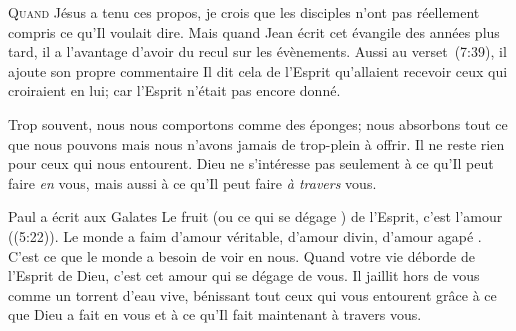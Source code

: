 





\lettrine{Q}{uand} Jésus a tenu ces propos,
 je crois que les disciples n'ont pas réellement compris
 ce qu'Il voulait dire. Mais quand Jean écrit cet évangile 
 des années plus tard, il a l'avantage d'avoir du recul sur les évènements.
 Aussi au verset~(7:39), il ajoute son propre commentaire\frcolon{}
 \Og Il dit cela de l'Esprit qu'allaient recevoir ceux qui croiraient en lui;
 car l'Esprit n'était pas encore donné. \Fg{}


Trop souvent, nous nous comportons comme des éponges;
 nous absorbons tout ce que nous pouvons mais nous n'avons jamais
 de trop-plein à offrir. Il ne reste rien pour ceux qui nous entourent.
 Dieu ne s'intéresse pas seulement à ce qu'Il peut faire \emph{en} vous,
 mais aussi à ce qu'Il peut faire \emph{à travers} vous.

Paul a écrit aux Galates\frcolon{} 
 \Og Le fruit (ou \Og ce qui se dégage \Fg{}) de l'Esprit,
 c'est l'amour \Fg{} ((5:22)).
 Le monde a faim d'amour véritable, d'amour divin, d'amour \Og agapé \Fg{}.
 C'est ce que le monde a besoin de voir en nous. Quand votre vie déborde
 de l'Esprit de Dieu, c'est cet amour qui se dégage de vous.
 Il jaillit hors de vous comme un torrent d'eau vive,
 bénissant tout ceux qui vous entourent grâce à ce que Dieu
 a fait en vous et à ce qu'Il fait maintenant à travers vous.

\dvrule



